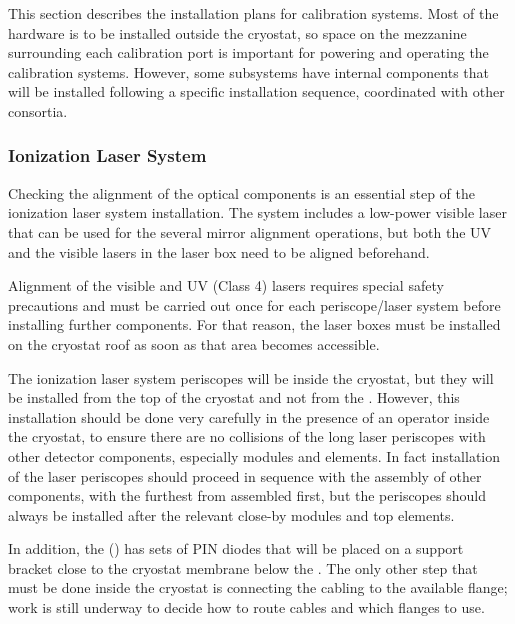 
This section describes the installation plans for calibration systems. Most of the hardware is to be installed outside the cryostat, so space on the mezzanine surrounding each calibration port is important for powering and operating the calibration systems. However, some subsystems have internal components that will be installed %
following a specific installation sequence, coordinated with other consortia.

\subsubsection{Ionization Laser System} 

Checking the alignment of the optical components is an essential step of the ionization laser system installation. The system includes a low-power visible laser that can be used for the several mirror alignment operations, but %
both the UV and the visible lasers in the laser box need to be aligned beforehand.

Alignment of the visible and UV (Class 4) lasers requires special safety precautions and must be carried out once for each periscope/laser system before installing further  components. For that reason, the laser boxes must be installed on the cryostat roof as soon as that area becomes accessible.  

The ionization laser system periscopes will be inside the cryostat, but they will be installed from the top of the cryostat and not from the . However, this installation should be done very carefully in the presence of an operator inside the cryostat, to ensure there are no collisions of the long laser periscopes with other detector components, especially  modules and  elements. In fact installation of the laser periscopes should proceed in sequence with the assembly of other components, with the furthest from  assembled first, but the periscopes should always be installed after the relevant close-by  modules and top  elements.


In addition, the  () has sets of PIN diodes that will be placed on a support bracket close to the cryostat membrane below the . The only other step that must be done inside the cryostat
is connecting the cabling to the available flange; work is still underway to decide how to route cables and which flanges to use. 

